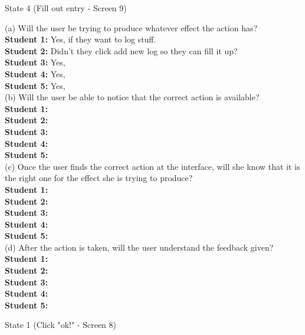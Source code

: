 \documentclass[pdftex,12pt,a4paper]{report}
\begin{document}
\begin{center}
State 4 (Fill out entry - Screen 9)
\end{center}

(a) Will the user be trying to produce whatever effect the action has?
\\\indent \textbf{Student 1:} Yes, if they want to log stuff.
\\\indent \textbf{Student 2:} Didn't they click add new log so they can fill it up?
\\\indent \textbf{Student 3:} Yes, 
\\\indent \textbf{Student 4:} Yes,
\\\indent \textbf{Student 5:} Yes, 
\\(b) Will the user be able to notice that the correct action is available?
\\\indent \textbf{Student 1:} 
\\\indent \textbf{Student 2:} 
\\\indent \textbf{Student 3:} 
\\\indent \textbf{Student 4:} 
\\\indent \textbf{Student 5:} 
\\(c) Once the user finds the correct action at the interface, will she know that it is the right one for the effect she is trying to produce?
\\\indent \textbf{Student 1:} 
\\\indent \textbf{Student 2:} 
\\\indent \textbf{Student 3:} 
\\\indent \textbf{Student 4:} 
\\\indent \textbf{Student 5:} 
\\(d) After the action is taken, will the user understand the feedback given?
\\\indent \textbf{Student 1:} 
\\\indent \textbf{Student 2:} 
\\\indent \textbf{Student 3:} 
\\\indent \textbf{Student 4:} 
\\\indent \textbf{Student 5:} 

\begin{center}
State 1 (Click "ok!" - Screen 8)
\end{center}
\end{document}
